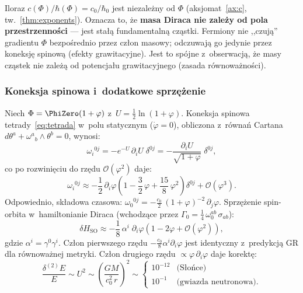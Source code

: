 \begin{remark}\label{rem:masa-fermion}
Iloraz $c(\Phi)/\hbar(\Phi) = c_0/\hbar_0$ jest niezale\.zny od
$\Phi$ (aksjomat~\ref{ax:c}, tw.~\ref{thm:exponents}). Oznacza to,
\.ze \textbf{masa Diraca nie zale\.zy od pola przestrzenno\'sci} ---
jest sta\l{}\k{a} fundamentaln\k{a} cz\k{a}stki. Fermiony nie ,,czuj\k{a}''
gradientu $\Phi$ bezpo\'srednio przez cz\l{}on masowy; odczuwaj\k{a}
go jedynie przez koneksj\k{e} spinow\k{a} (efekty grawitacyjne).
Jest to sp\'ojne z~obserwacj\k{a}, \.ze masy cz\k{a}stek nie
zale\.z\k{a} od potencja\l{}u grawitacyjnego (zasada r\'ownowa\.zno\'sci).
\end{remark}

\subsubsection{Koneksja spinowa i~dodatkowe sprz\k{e}\.zenie}

\begin{proposition}%
\label{prop:spin-connection}
Niech $\Phi = \PhiZero(1 + \varphi)$ z~$U = \tfrac{1}{2}\ln(1+\varphi)$.
Koneksja spinowa tetrady~\eqref{eq:tetrada} w~polu statycznym
($\dot\varphi = 0$), obliczona z~r\'owna\'n Cartana
$d\theta^a + \omega^a{}_b \wedge \theta^b = 0$, wynosi:
\begin{equation}\label{eq:spin-conn-full}
  \omega_i{}^{0j}
  = -e^{-U}\,\partial_i U\;\delta^{0j}
  = -\frac{\partial_i U}{\sqrt{1+\varphi}}\;\delta^{0j},
\end{equation}
co po rozwini\k{e}ciu do rz\k{e}du $\mathcal{O}(\varphi^2)$ daje:
\begin{equation}\label{eq:spin-conn-2nd}
  \boxed{
    \omega_i{}^{0j}
    \approx -\frac{1}{2}\,\partial_i\varphi
    \left(1 - \frac{3}{2}\,\varphi + \frac{15}{8}\,\varphi^2\right)
    \delta^{0j}
    + \mathcal{O}(\varphi^3).
  }
\end{equation}
Odpowiednio, sk\l{}adowa czasowa:
$\omega_0{}^{0j} = -\frac{c_0}{2}\,(1+\varphi)^{-2}\,\partial_j\varphi$.
Sprz\k{e}\.zenie spin-orbita w~hamiltonianie Diraca
(wchodz\k{a}ce przez $\Gamma_0 = \tfrac{1}{4}\,\omega_0^{ab}\,\sigma_{ab}$):
\begin{equation}\label{eq:spin-orbit-TGP}
  \delta H_{\mathrm{SO}}
  \approx -\frac{1}{8}\,\alpha^i\;\partial_i\varphi
  \left(1 - 2\varphi + \mathcal{O}(\varphi^2)\right),
\end{equation}
gdzie $\alpha^i = \gamma^0\gamma^i$. Cz\l{}on pierwszego rz\k{e}du
$-\frac{c_0}{8}\alpha^i\partial_i\varphi$
jest identyczny z~predykcj\k{a} GR dla r\'ownowa\.znej metryki.
Cz\l{}on drugiego rz\k{e}du $\propto \varphi\,\partial_i\varphi$
daje korekt\k{e}:
\begin{equation}\label{eq:delta2-dirac}
  \frac{\delta^{(2)} E}{E}
  \sim U^2 \sim \left(\frac{GM}{c_0^2\,r}\right)^{\!2}
  \sim \begin{cases}
    10^{-12} & \text{(S\l{}o\'nce)} \\
    10^{-1} & \text{(gwiazda neutronowa)}.
  \end{cases}
\end{equation}
\end{proposition}

